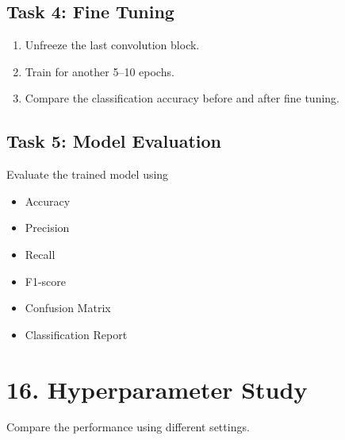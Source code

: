 \documentclass[11pt]{article}
\begin{document}
\subsection*{Task 4: Fine Tuning}

\begin{enumerate}

\item Unfreeze the last convolution block.

\item Train for another 5--10 epochs.

\item Compare the classification accuracy before and after fine tuning.

\end{enumerate}

\subsection*{Task 5: Model Evaluation}

Evaluate the trained model using

\begin{itemize}

\item Accuracy

\item Precision

\item Recall

\item F1-score

\item Confusion Matrix

\item Classification Report

\end{itemize}

\section*{16. Hyperparameter Study}

Compare the performance using different settings.
\end{document}
